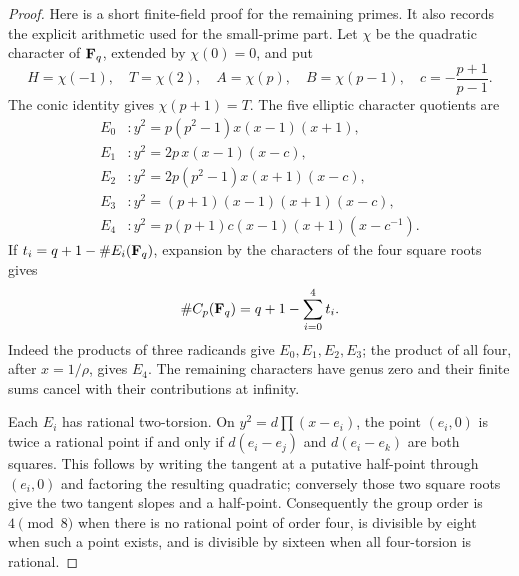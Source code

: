 \begin{proof}
Here is a short finite-field proof for the remaining primes.  It also
records the explicit arithmetic used for the small-prime part.
Let $\chi$ be the quadratic character of $\mathbf F_q$, extended by $\chi(0)=0$,
and put
\[
 H=\chi(-1),\quad T=\chi(2),\quad A=\chi(p),\quad B=\chi(p-1),
 \quad c=-\frac{p+1}{p-1}.
\]
The conic identity gives $\chi(p+1)=T$.
The five elliptic character quotients are
\begin{align*}
 E_0 &:y^2=p(p^2-1)x(x-1)(x+1),\\
 E_1 &:y^2=2p\,x(x-1)(x-c),\\
 E_2 &:y^2=2p(p^2-1)x(x+1)(x-c),\\
 E_3 &:y^2=(p+1)(x-1)(x+1)(x-c),\\
 E_4 &:y^2=p(p+1)c(x-1)(x+1)(x-c^{-1}).
\end{align*}
If $t_i=q+1-\#E_i(\mathbf F_q)$, expansion by the characters of the four
square roots gives
\begin{equation}\label{eq:hp-five-traces}
 \#C_p(\mathbf F_q)=q+1-\sum_{i=0}^4t_i.
\end{equation}
Indeed the products of three radicands give $E_0,E_1,E_2,E_3$;
the product of all four, after $x=1/\rho$, gives $E_4$.
The remaining characters have genus zero and their finite sums cancel
with their contributions at infinity.

Each $E_i$ has rational two-torsion.  On
$y^2=d\prod(x-e_i)$, the point $(e_i,0)$ is twice a rational point
if and only if $d(e_i-e_j)$ and $d(e_i-e_k)$ are both squares.
This follows by writing the tangent at a putative half-point through
$(e_i,0)$ and factoring the resulting quadratic; conversely those two
square roots give the two tangent slopes and a half-point.
Consequently the group order is $4\pmod8$ when there is no rational
point of order four, is divisible by eight when such a point exists,
and is divisible by sixteen when all four-torsion is rational.


\end{proof}
